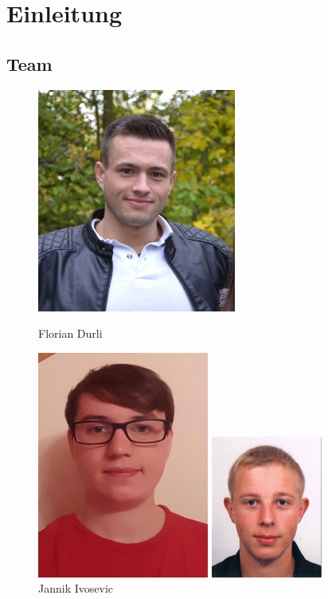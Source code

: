 \chapter{Einleitung}
\section{Team}
\begin{figure}[htb]
	\centering
	\begin{minipage}{0.45\linewidth}
		\centering
		\includegraphics[scale=0.5]{content/pictures/Florian.png}
		\caption{Florian Durli}
		\vspace{30pt}
	\end{minipage}
	\begin{minipage}{0.45\linewidth}
		\centering
		\includegraphics[scale=0.56]{content/pictures/Jannik.png}
		\caption{Jannik Ivosevic}
		\vspace{30pt}
	\end{minipage}
	\begin{minipage}{0.45\linewidth}
		\centering
		\includegraphics[scale=0.87]{content/pictures/Johannes.png}

\end{minipage}
\end{figure}
